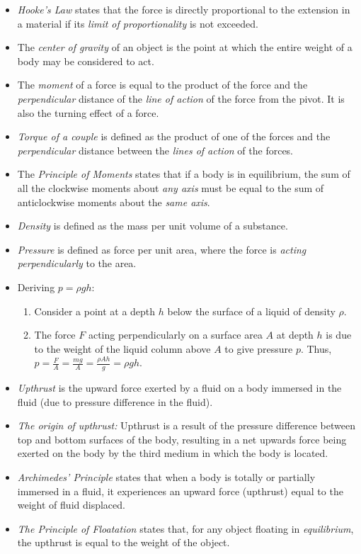 \documentclass[oneside]{book}
\begin{document}
\begin{itemize}
    \item \emph{Hooke's Law} states that the force is directly proportional to the extension in a material if its \emph{limit of proportionality} is not exceeded.
    \item The \emph{center of gravity} of an object is the point at which the entire weight of a body may be considered to act.
    \item The \emph{moment} of a force is equal to the product of the force and the \emph{perpendicular} distance of the \emph{line of action} of the force from the pivot. It is also the turning effect of a force.
    \item \emph{Torque of a couple} is defined as the product of one of the forces and the \emph{perpendicular} distance between the \emph{lines of action} of the forces.
    \item The \emph{Principle of Moments} states that if a body is in equilibrium, the sum of all the clockwise moments about \emph{any axis} must be equal to the sum of anticlockwise moments about the \emph{same axis}.
    \item \emph{Density} is defined as the mass per unit volume of a substance.
    \item \emph{Pressure} is defined as force per unit area, where the force is \emph{acting perpendicularly} to the area.
    \item Deriving \(p=\rho gh\):
    \begin{enumerate}
        \item Consider a point at a depth \(h\) below the surface of a liquid of density \(\rho\). 
        \item The force \(F\) acting perpendicularly on a surface area \(A\) at depth \(h\) is due to the weight of the liquid column above \(A\) to give pressure \(p\). Thus, \(p=\frac{F}{A}=\frac{mg}{A}=\frac{\rho Ah}{g}=\rho gh\).
    \end{enumerate}
    \item \emph{Upthrust} is the upward force exerted by a fluid on a body immersed in the fluid (due to pressure difference in the fluid).
    \item \emph{The origin of upthrust:} Upthrust is a result of the pressure difference between top and bottom surfaces of the body, resulting in a net upwards force being exerted on the body by the third medium in which the body is located.
    \item \emph{Archimedes' Principle} states that when a body is totally or partially immersed in a fluid, it experiences an upward force (upthrust) equal to the weight of fluid displaced.
    \item \emph{The Principle of Floatation} states that, for any object floating in \emph{equilibrium}, the upthrust is equal to the weight of the object.
\end{itemize}
\end{document}
